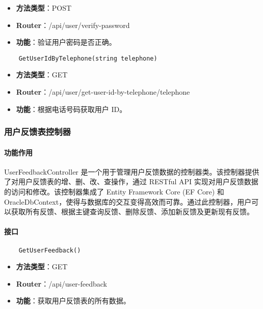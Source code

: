 \begin{itemize}
	\item \textbf{方法类型}：POST
	\item \textbf{Router}：/api/user/verify-password
	\item \textbf{功能}：验证用户密码是否正确。
\end{itemize}

\begin{verbatim}
	GetUserIdByTelephone(string telephone)
\end{verbatim}

\begin{itemize}
	\item \textbf{方法类型}：GET
	\item \textbf{Router}：/api/user/get-user-id-by-telephone/{telephone}
	\item \textbf{功能}：根据电话号码获取用户 ID。
\end{itemize}

\subsubsection{用户反馈表控制器}

\paragraph{功能作用}

UserFeedbackController 是一个用于管理用户反馈数据的控制器类。该控制器提供了对用户反馈表的增、删、改、查操作，通过 RESTful API 实现对用户反馈数据的访问和修改。该控制器集成了 Entity Framework Core (EF Core) 和 OracleDbContext，使得与数据库的交互变得高效而可靠。通过此控制器，用户可以获取所有反馈、根据主键查询反馈、删除反馈、添加新反馈及更新现有反馈。

\paragraph{接口}

\begin{verbatim}
	GetUserFeedback()
\end{verbatim}

\begin{itemize}
	\item \textbf{方法类型}：GET
	\item \textbf{Router}：/api/user-feedback
	\item \textbf{功能}：获取用户反馈表的所有数据。
\end{itemize}

